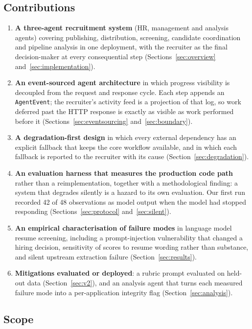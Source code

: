 \documentclass[conference]{IEEEtran}
\begin{document}
\subsection{Contributions}

\begin{enumerate}
\item \textbf{A three-agent recruitment system} (HR, management and analysis
agents) covering publishing, distribution, screening, candidate coordination
and pipeline analysis in one deployment, with the recruiter as the final
decision-maker at every consequential step (Sections~\ref{sec:overview}
and~\ref{sec:implementation}).
\item \textbf{An event-sourced agent architecture} in which progress visibility
is decoupled from the request and response cycle. Each step appends an
\texttt{AgentEvent}; the recruiter's activity feed is a projection of that log,
so work deferred past the HTTP response is exactly as visible as work performed
before it (Sections~\ref{sec:eventsourcing} and~\ref{sec:boundary}).
\item \textbf{A degradation-first design} in which every external dependency has
an explicit fallback that keeps the core workflow available, and in which each
fallback is reported to the recruiter with its cause
(Section~\ref{sec:degradation}).
\item \textbf{An evaluation harness that measures the production code path}
rather than a reimplementation, together with a methodological finding: a system
that degrades silently is a hazard to its own evaluation. Our first run recorded
42 of 48 observations as model output when the model had stopped responding
(Sections~\ref{sec:protocol} and~\ref{sec:silent}).
\item \textbf{An empirical characterisation of failure modes} in language model
resume screening, including a prompt-injection vulnerability that changed a
hiring decision, sensitivity of scores to resume wording rather than substance,
and silent upstream extraction failure (Section~\ref{sec:results}).
\item \textbf{Mitigations evaluated or deployed}: a rubric prompt evaluated on
held-out data (Section~\ref{sec:v2}), and an analysis agent that turns each
measured failure mode into a per-application integrity flag
(Section~\ref{sec:analysis}).
\end{enumerate}

\subsection{Scope}
\end{document}
